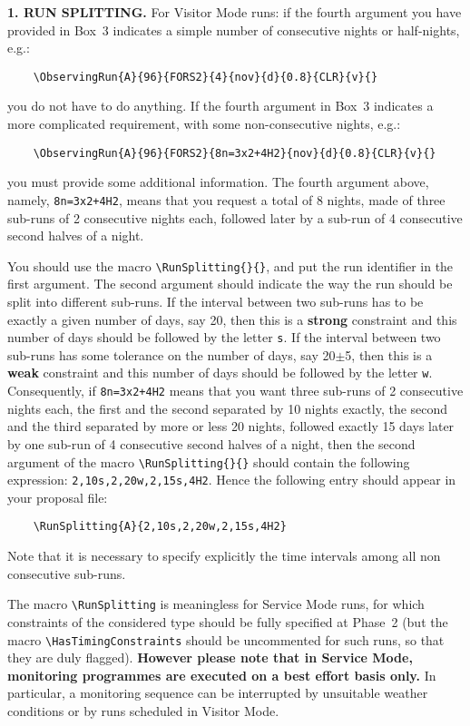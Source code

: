 \documentclass{article}
\begin{document}
{\bf 1. RUN SPLITTING.} For Visitor Mode runs: if the fourth argument
you have provided in 
Box~3 indicates a simple number of consecutive nights or half-nights,
e.g.:
\begin{verbatim}
    \ObservingRun{A}{96}{FORS2}{4}{nov}{d}{0.8}{CLR}{v}{}
\end{verbatim}
you do not have to do anything.  If the fourth argument in Box~3
indicates a more complicated requirement, with some non-consecutive
nights, e.g.: 
\begin{verbatim}
    \ObservingRun{A}{96}{FORS2}{8n=3x2+4H2}{nov}{d}{0.8}{CLR}{v}{}
\end{verbatim}
you must provide some additional information.  The fourth argument above,
namely, \verb|8n=3x2+4H2|, means that you request a total of 8 nights,
made of three sub-runs of 2 consecutive nights each, followed later by
a sub-run of 4 consecutive second halves of a night.

You should use the macro \verb|\RunSplitting{}{}|, and put
the run identifier in the first argument.  The second argument should indicate
the way the run should be split into different sub-runs.  If the
interval between two sub-runs has to be exactly a given number of
days, say 20, then this is a {\bf strong} constraint and this number
of days should be followed by the letter \verb|s|.  If the interval
between two sub-runs has some tolerance on the number of days, say
20$\pm$5, then this is a {\bf weak} constraint and this number of days
should be followed by the letter \verb|w|.  Consequently, if
\verb|8n=3x2+4H2| means that you want three sub-runs of 2 consecutive
nights each, the first and the second separated by 10 nights exactly,
the second and the third separated by more or less 20 nights, followed
exactly 15 days later by one sub-run of 4 consecutive second halves of
a night, then the second argument of the macro
\verb|\RunSplitting{}{}| should contain the following expression:
\verb|2,10s,2,20w,2,15s,4H2|. Hence the following entry should appear
in your proposal file:
\begin{verbatim}
    \RunSplitting{A}{2,10s,2,20w,2,15s,4H2}
\end{verbatim}

Note that it is necessary to specify explicitly the time intervals
among all non consecutive sub-runs.

The macro \verb|\RunSplitting| is meaningless for Service Mode runs,
for which constraints of the considered type should be fully specified
at Phase~2 (but the macro \verb|\HasTimingConstraints| should be
uncommented for such runs, so that they are duly flagged). {\bf
  However please note that in Service Mode, 
  monitoring programmes are executed on a best effort 
  basis only.} In particular, a monitoring sequence can be interrupted
by unsuitable weather conditions or by runs scheduled in Visitor Mode.
\end{document}
